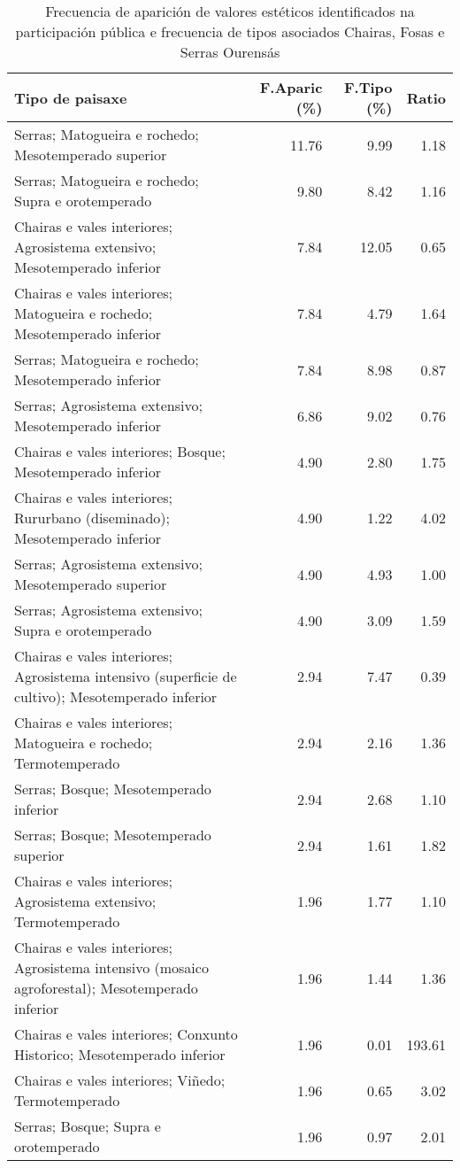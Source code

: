 \begin{table}[p]
\centering
\caption{Frecuencia de aparición de valores estéticos identificados na participación pública e frecuencia de tipos asociados Chairas, Fosas e Serras Ourensás} 
\label{vsixotest8}
\begin{tabular}{lrrr}
  \hline
Tipo de paisaxe & F.Aparic (\%) & F.Tipo (\%) & Ratio \\ 
  \hline
Serras; Matogueira e rochedo; Mesotemperado superior & 11.76 & 9.99 & 1.18 \\ 
  Serras; Matogueira e rochedo; Supra e orotemperado & 9.80 & 8.42 & 1.16 \\ 
  Chairas e vales interiores; Agrosistema extensivo; Mesotemperado inferior & 7.84 & 12.05 & 0.65 \\ 
  Chairas e vales interiores; Matogueira e rochedo; Mesotemperado inferior & 7.84 & 4.79 & 1.64 \\ 
  Serras; Matogueira e rochedo; Mesotemperado inferior & 7.84 & 8.98 & 0.87 \\ 
  Serras; Agrosistema extensivo; Mesotemperado inferior & 6.86 & 9.02 & 0.76 \\ 
  Chairas e vales interiores; Bosque; Mesotemperado inferior & 4.90 & 2.80 & 1.75 \\ 
  Chairas e vales interiores; Rururbano (diseminado); Mesotemperado inferior & 4.90 & 1.22 & 4.02 \\ 
  Serras; Agrosistema extensivo; Mesotemperado superior & 4.90 & 4.93 & 1.00 \\ 
  Serras; Agrosistema extensivo; Supra e orotemperado & 4.90 & 3.09 & 1.59 \\ 
  Chairas e vales interiores; Agrosistema intensivo (superficie de cultivo); Mesotemperado inferior & 2.94 & 7.47 & 0.39 \\ 
  Chairas e vales interiores; Matogueira e rochedo; Termotemperado & 2.94 & 2.16 & 1.36 \\ 
  Serras; Bosque; Mesotemperado inferior & 2.94 & 2.68 & 1.10 \\ 
  Serras; Bosque; Mesotemperado superior & 2.94 & 1.61 & 1.82 \\ 
  Chairas e vales interiores; Agrosistema extensivo; Termotemperado & 1.96 & 1.77 & 1.10 \\ 
  Chairas e vales interiores; Agrosistema intensivo (mosaico agroforestal); Mesotemperado inferior & 1.96 & 1.44 & 1.36 \\ 
  Chairas e vales interiores; Conxunto Historico; Mesotemperado inferior & 1.96 & 0.01 & 193.61 \\ 
  Chairas e vales interiores; Viñedo; Termotemperado & 1.96 & 0.65 & 3.02 \\ 
  Serras; Bosque; Supra e orotemperado & 1.96 & 0.97 & 2.01 \\ 
   \hline
\end{tabular}
\end{table}
